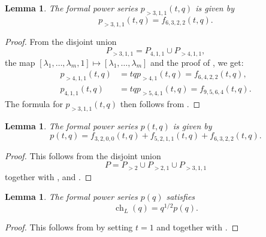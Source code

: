 \documentclass[a4paper, 12pt, reqno]{amsart}
\newtheorem{lemma}[theorem]{Lemma}
\theoremstyle{remark}
\DeclareMathOperator{\ch}{ch}
\begin{document}
\begin{lemma}
  \label{lmm:4}
  The formal power series $p_{>3, 1, 1}(t, q)$ is given by
  \begin{equation*}
    p_{>3, 1, 1}(t, q) = f_{6, 3, 2, 2}(t, q).
  \end{equation*}
\end{lemma}

\begin{proof}
  From the disjoint union
  \begin{equation*}
    P_{>3, 1, 1} = P_{4, 1, 1} \cup P_{>4, 1, 1},
  \end{equation*}
  the map $[\lambda_1, \dots, \lambda_m, 1] \mapsto [\lambda_1, \dots, \lambda_m]$ and the proof of , we get:
  \begin{align*}
    p_{>4, 1, 1}(t, q) &= tqp_{>4, 1}(t, q) = f_{6, 4, 2, 2}(t, q), \\
    p_{4, 1, 1}(t, q) &= tqp_{>5, 4, 1}(t, q) = f_{9, 5, 6, 4}(t, q).
  \end{align*}
  The formula for $p_{>3, 1, 1}(t, q)$ then follows from .
\end{proof}

\begin{lemma}
  \label{lmm:5}
  The formal power series $p(t, q)$ is given by
  \begin{equation*}
    p(t, q) = f_{3, 2, 0, 0}(t, q) + f_{5, 2, 1, 1}(t, q) + f_{6, 3, 2, 2}(t, q).
  \end{equation*}
\end{lemma}

\begin{proof}
  This follows from the disjoint union
  \begin{equation*}
    P = P_{>2} \cup P_{>2, 1} \cup P_{>3, 1, 1}
  \end{equation*}
  together with ,  and .
\end{proof}

\begin{lemma}
  \label{lmm:6}
  The formal power series $p(q)$ satisfies
  \begin{equation*}
    \ch_{L}(q) = q^{1/2}p(q).
  \end{equation*}
\end{lemma}

\begin{proof}
  This follows from  by setting $t = 1$ and \cite[Theorem 4]{andrews_singular_2022} together with .
\end{proof}
\end{document}
